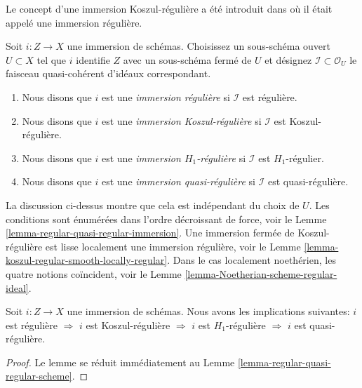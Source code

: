 \begin{definition}
\label{definition-regular-immersion}
\begin{reference}
Le concept d'une immersion Koszul-régulière a été introduit dans  \cite[Expose VII, Definition 1.4]{SGA6}  où
il était appelé une immersion régulière.
\end{reference}
Soit  $i : Z \to X$  une immersion de schémas. Choisissez un sous-schéma ouvert
 $U \subset X$  tel que  $i$  identifie  $Z$  avec un sous-schéma fermé
de  $U$  et désignez  $\mathcal{I} \subset \mathcal{O}_U$  le faisceau quasi-cohérent d'idéaux
correspondant.
\begin{enumerate}
\item Nous disons que  $i$  est une  {\it  immersion
régulière}  si  $\mathcal{I}$  est régulière.
\item Nous disons que  $i$  est une  {\it  immersion
Koszul-régulière}  si  $\mathcal{I}$  est Koszul-régulière.
\item Nous disons que  $i$  est une  {\it  immersion
 $H_1$-régulière}  si  $\mathcal{I}$  est  $H_1$-régulier.
\item Nous disons que  $i$  est une  {\it  immersion
quasi-régulière}  si  $\mathcal{I}$  est quasi-régulière.
\end{enumerate}
\end{definition}

\noindent
La discussion ci-dessus montre que cela est indépendant du choix de  $U$.
Les conditions sont énumérées dans l'ordre décroissant de force, voir le Lemme
 \ref{lemma-regular-quasi-regular-immersion}. Une immersion fermée de Koszul-régulière est lisse localement une
immersion régulière, voir le Lemme  \ref{lemma-koszul-regular-smooth-locally-regular}. Dans le cas localement
noethérien, les quatre notions coïncident, voir le Lemme  \ref{lemma-Noetherian-scheme-regular-ideal}.

\begin{lemma}
\label{lemma-regular-quasi-regular-immersion}
Soit  $i : Z \to X$  une immersion de schémas. Nous avons les implications suivantes:
 $i$  est régulière  $\Rightarrow$   $i$  est Koszul-régulière
 $\Rightarrow$   $i$  est  $H_1$-régulière  $\Rightarrow$   $i$  est
quasi-régulière.
\end{lemma}

\begin{proof}
Le lemme se réduit immédiatement au Lemme  \ref{lemma-regular-quasi-regular-scheme}.
\end{proof}

